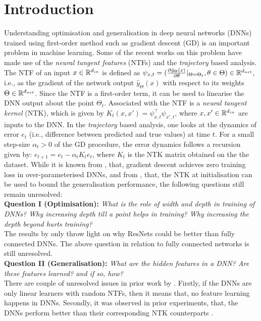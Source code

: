 \section{Introduction}
Understanding optimisation and generalisation in deep neural networks (DNNs) trained using first-order method such as gradient descent (GD) is an important problem in machine learning. Some of the recent works on this problem have made use of the \emph{neural tangent features} (NTFs) and the \emph{trajectory} based analysis. The NTF of an input $x\in \mathbb{R}^{d_{in}}$ is defined as $\psi_{x,t}=(\frac{\partial \hat{y}_{\Theta}(x)}{\partial \theta}|_{\Theta=\Theta_t},\theta \in \Theta)\in \mathbb{R}^{d_{net}}$, i.e., as the gradient of the network output $\hat{y}_{\Theta}(x)$ with respect to its weights $\Theta\in\mathbb{R}^{d_{net}}$. Since the NTF is a first-order term, it can be used to linearise the DNN output about the point $\Theta_t$. Associated with the NTF is a \emph{neural tangent kernel} (NTK), which is given by $K_t(x,x')=\psi^\top_{x,t}\psi_{x',t}$, where $x,x'\in\mathbb{R}^{d_{in}}$ are inputs to the DNN. In the \emph{trajectory} based analysis, one looks at the dynamics of error $e_t$  (i.e., difference between predicted and true values) at time $t$. For a small step-size $\alpha_t>0$ of the GD procedure, the error dynamics follows a recursion given by: $e_{t+1}=e_t-\alpha_tK_te_t$, where $K_t$ is the NTK matrix obtained on the the dataset. While it is known from \cite{dudnn}, that, gradient descent achieves zero training loss in over-parameterised DNNs, and from \cite{cao2019generalization}, that, the NTK at initialisation can be used to bound the generalisation performance, the following questions still remain unresolved: \hfill\\
\textbf{Question I (Optimisation):} \emph{What is the role of width and depth in training of DNNs? Why increasing depth till a point helps in training? Why increasing the depth beyond hurts training?}\\
The results by \cite{dudnn} only throw light on why ResNets could be better than fully connected DNNs. The above question in relation to fully connected networks is still unresolved.\\
\textbf{Question II (Generalisation):} \emph{What are the hidden features in a DNN? Are these features learned? and if so, how?} \hfill\\
There are couple of unresolved issues in prior work by \cite{arora2019exact,cao2019generalization}. Firstly, if the DNNs are only linear learners with random NTFs, then it means that, no feature learning happens in DNNs. Secondly, it was observed in prior experiments, that, the DNNs perform better than their corresponding NTK counterparts \cite{arora2019exact,lee2017deep}. \hfill\\

